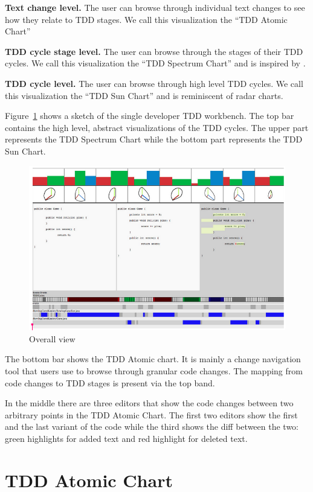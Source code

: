 \documentclass[journal]{vgtc}                %
\begin{document}
\textbf{Text change level.} The user can browse through individual text changes to see how they relate to TDD stages. We call this visualization the ``TDD Atomic Chart''

\textbf{TDD cycle stage level.} The user can browse through the stages of their TDD cycles. We call this visualization the ``TDD Spectrum Chart'' and is inspired by \cite{one}.

\textbf{TDD cycle level.} The user can browse through high level TDD cycles. We call this visualization the ``TDD Sun Chart'' and is reminiscent of radar charts.

Figure~\ref{fig:one} shows a sketch of the single developer TDD workbench.
The top bar contains the high level, abstract visualizations of the TDD cycles. The upper part represents the TDD Spectrum Chart while the bottom part represents the TDD Sun Chart. 

\begin{figure}[hbt]
	\includegraphics[width=\textwidth]{fig1}
	\caption{Overall view}
\label{fig:one}
\end{figure}

The bottom bar shows the TDD Atomic chart. It is mainly a change navigation tool that users use to browse through granular code changes. The mapping from code changes to TDD stages is present via the top band.

In the middle there are three editors that show the code changes between two arbitrary points in the TDD Atomic Chart. The first two editors show the first and the last variant of the code while the third shows the diff between the two: green highlights for added text and red highlight for deleted text.

\section{TDD Atomic Chart}
\end{document}
